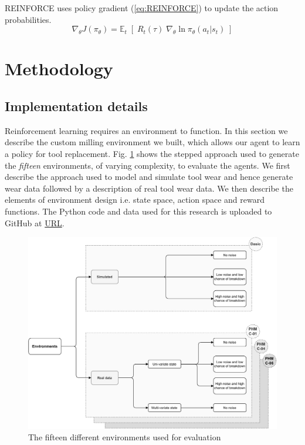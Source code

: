 \documentclass[a4paper, 12pt]{article}
\begin{document}
REINFORCE uses policy gradient (\ref{eq:REINFORCE}) to update the action probabilities.
\begin{equation}
	\nabla_ \theta J(\pi_\theta) = \mathbb{E}_t \; [ \; R_t(\tau) \; \nabla_\theta \ln \pi_\theta(a_t \vert s_t) \;]
	\label{eq:REINFORCE}
\end{equation}

\section{Methodology}\label{sec:Method}
\subsection{Implementation details}\label{sec:Implementation}
Reinforcement learning requires an environment to function. In this section we describe the custom milling environment we built, which allows our agent to learn a policy for tool replacement. Fig. \ref{fig:environments} shows the stepped approach used to generate the \textit{fifteen} environments, of varying complexity, to evaluate the agents. We first describe the approach used to model and simulate tool wear and hence generate wear data followed by a description of real tool wear data. We then describe the elements of environment design i.e. state space, action space and reward functions. The Python code and data used for this research is uploaded to GitHub at \href{https://github.com/Rajesh-Siraskar/Empirical_Study_REINFORCE}{URL}.  %
\begin{figure}[ht]
	\centering
	\includegraphics[width=\textwidth]{Environments.pdf}  
	\caption{The fifteen different environments used for evaluation}
	\label{fig:environments}
\end{figure} 
\end{document}
